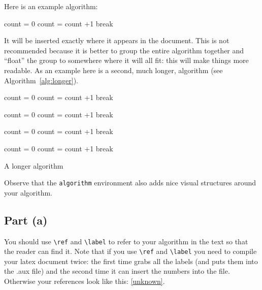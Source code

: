 \documentclass{article} %
\begin{document}
Here is an example algorithm:  
\begin{algorithmic}
\Statex {}
\State count = 0
          \State count = count +1
          \State break
        \EndIf
     \EndFor

\EndFor
\EndProcedure
\end{algorithmic}
It will be inserted exactly where it appears in the document.  This is not recommended because it is better to group the entire algorithm together and ``float'' the group to somewhere where it will all fit: this will make things more readable.  As an example here is a second, much longer, algorithm (see Algorithm~\ref{alg:longer}).
\begin{algorithm}
\begin{algorithmic}
\Statex {}
\State count = 0
          \State count = count +1
          \State break
        \EndIf
     \EndFor

\EndFor
\State count = 0
          \State count = count +1
          \State break
        \EndIf
     \EndFor

\EndFor
\State count = 0
          \State count = count +1
          \State break
        \EndIf
     \EndFor

\EndFor
\State count = 0
          \State count = count +1
          \State break
        \EndIf
     \EndFor

\EndFor
\EndProcedure
\end{algorithmic}
\caption{A longer algorithm}\label{alg:longer}
\end{algorithm}

Observe that the \texttt{algorithm} environment also adds nice visual structures around your algorithm.

\subsection*{Part (a)}

You should use \verb|\ref| and \verb|\label| to refer to your algorithm in the text so that the reader can find it.  Note that if you use \verb|\ref| and \verb|\label| you need to compile your latex document twice: the first time grabs all the labels (and puts them into the .aux file) and the second time it can insert the numbers into the file.  Otherwise your references look like this: \ref{unknown}.
\end{document}
